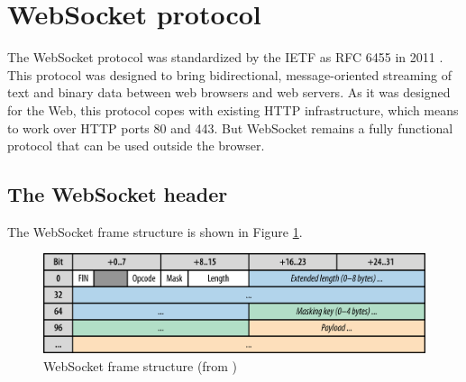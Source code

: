 \documentclass[journal,compsoc]{IEEEtran}
\newcommand{\ws}{WebSocket}
\begin{document}
\section{\ws{} protocol}
The \ws{} protocol was standardized by the IETF as RFC 6455 in 2011 \cite{rfc6455}.
This protocol was designed to bring bidirectional, message-oriented streaming of text and binary data between web browsers and web servers.
As it was designed for the Web, this protocol copes with existing HTTP infrastructure, which means to work over HTTP ports 80 and 443.
But \ws{} remains a fully functional protocol that can be used outside the browser.

\subsection{The \ws{} header}

The \ws{} frame structure is shown in Figure \ref{fig:websocket_frame}.

\begin{figure}
    \centering
    \label{fig:websocket_frame}
    \includegraphics[width=\linewidth]{websocket_frame.png}
    \caption{\ws{} frame structure (from \cite{HighPerfBrowserNetworking:websocket})}
\end{figure}
\end{document}
